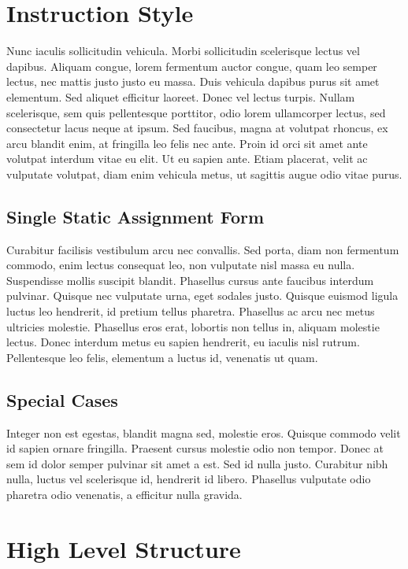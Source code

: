 \section{Instruction Style}
Nunc iaculis sollicitudin vehicula. Morbi sollicitudin scelerisque lectus vel dapibus. Aliquam congue, lorem fermentum auctor congue, quam leo semper lectus, nec mattis justo justo eu massa. Duis vehicula dapibus purus sit amet elementum. Sed aliquet efficitur laoreet. Donec vel lectus turpis. Nullam scelerisque, sem quis pellentesque porttitor, odio lorem ullamcorper lectus, sed consectetur lacus neque at ipsum. Sed faucibus, magna at volutpat rhoncus, ex arcu blandit enim, at fringilla leo felis nec ante. Proin id orci sit amet ante volutpat interdum vitae eu elit. Ut eu sapien ante. Etiam placerat, velit ac vulputate volutpat, diam enim vehicula metus, ut sagittis augue odio vitae purus.

\subsection{Single Static Assignment Form}
Curabitur facilisis vestibulum arcu nec convallis. Sed porta, diam non fermentum commodo, enim lectus consequat leo, non vulputate nisl massa eu nulla. Suspendisse mollis suscipit blandit. Phasellus cursus ante faucibus interdum pulvinar. Quisque nec vulputate urna, eget sodales justo. Quisque euismod ligula luctus leo hendrerit, id pretium tellus pharetra. Phasellus ac arcu nec metus ultricies molestie. Phasellus eros erat, lobortis non tellus in, aliquam molestie lectus. Donec interdum metus eu sapien hendrerit, eu iaculis nisl rutrum. Pellentesque leo felis, elementum a luctus id, venenatis ut quam.

\subsection{Special Cases}
Integer non est egestas, blandit magna sed, molestie eros. Quisque commodo velit id sapien ornare fringilla. Praesent cursus molestie odio non tempor. Donec at sem id dolor semper pulvinar sit amet a est. Sed id nulla justo. Curabitur nibh nulla, luctus vel scelerisque id, hendrerit id libero. Phasellus vulputate odio pharetra odio venenatis, a efficitur nulla gravida.


\section{High Level Structure}
